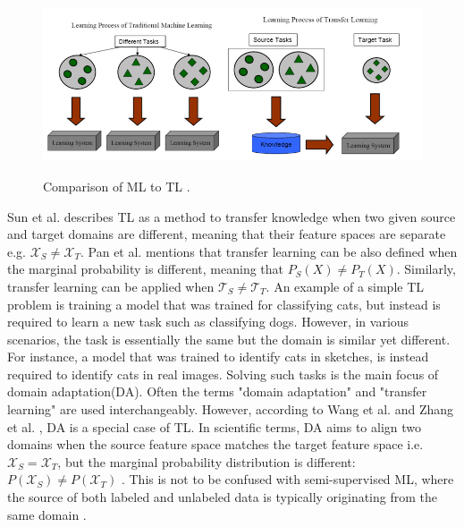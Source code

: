  
\begin{figure}[htb]
	\begin{center}
		\includegraphics[width=16cm]{./TL.png}
	\end{center}
	\caption{Comparison of ML to TL \cite{Pan2010}.}
	\begin{center}
		\label{TL}
	\end{center}
\end{figure}

Sun et al. \cite{SUN201584} describes TL as a method to transfer knowledge when two given source and target domains are different, meaning that their feature spaces are separate e.g. $\mathcal{X}_{S} \neq \mathcal{X}_{T}$. Pan et al. \cite{Pan2010} mentions that transfer learning can be also defined when the marginal probability is different, meaning that $P_{S}(X) \neq P_{T}(X)$. Similarly, transfer learning can be applied when $\mathcal{T}_{S} \neq \mathcal{T}_{T}$. An example of a simple TL problem is training a model that was trained for classifying cats, but instead is  required to learn a new task such as classifying dogs. However, in various scenarios, the task is essentially the same but the domain is similar yet different. For instance, a model that was trained to identify cats in sketches, is instead required to identify cats in real images. Solving such tasks is the main focus of domain adaptation(DA). Often the terms "domain adaptation" and "transfer learning" are used interchangeably. However, according to Wang et al. \cite{Wang2018} and Zhang et al. \cite{Zhang2021}, DA is a special case of TL. In scientific terms, DA aims to align two domains when the source feature space matches the target feature space i.e. $\mathcal{X}_{S}=\mathcal{X}_{T}$, but the marginal probability distribution is different: $P\left(\mathcal{X}_{S}\right) \neq P\left(\mathcal{X}_{T}\right)$ \cite{SUN201584}. This is not to be confused with semi-supervised ML, where the source of both labeled and unlabeled data is typically originating from the same domain \cite{SUN201584}. 
\FloatBarrier

